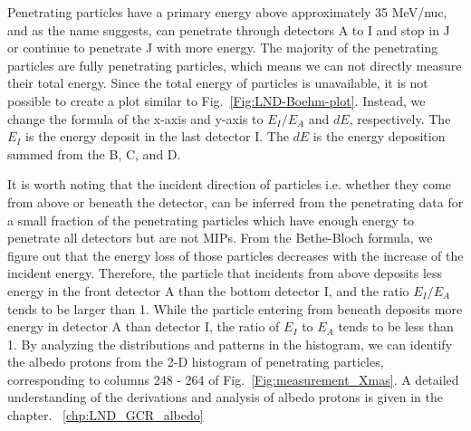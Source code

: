 Penetrating particles have a primary energy above approximately 35 MeV/nuc, and as the name suggests, can penetrate through detectors A to I and stop in J or continue to penetrate J with more energy. The majority of the penetrating particles are fully penetrating particles, which means we can not directly measure their total energy. 
Since the total energy of particles is unavailable, it is not possible to create a plot similar to Fig.~\ref{Fig:LND-Boehm-plot}. Instead, we change the formula of the x-axis and y-axis to $E_I/E_A$ and $dE$, respectively. The $E_I$ is the energy deposit in the last detector I. The $dE$ is the energy deposition summed from the B, C, and D.

It is worth noting that the incident direction of particles i.e. whether they come from above or beneath the detector, can be inferred from the penetrating data for a small fraction of the penetrating particles which have enough energy to penetrate all detectors but are not \acp{MIP}. From the Bethe-Bloch formula, we figure out that the energy loss of those particles decreases with the increase of the incident energy. 
Therefore, the particle that incidents from above deposits less energy in the front detector A than the bottom detector I, and the ratio $E_I/E_A$ tends to be larger than 1. While the particle entering from beneath deposits more energy in detector A than detector I, the ratio of $E_I$ to $E_A$ tends to be less than 1. 
By analyzing the distributions and patterns in the histogram, we can identify the albedo protons from the 2-D histogram of penetrating particles, corresponding to columns 248 - 264 of Fig.~\ref{Fig:measurement_Xmas}.
A detailed understanding of the derivations and analysis of albedo protons is given in the chapter. ~\ref{chp:LND_GCR_albedo}


